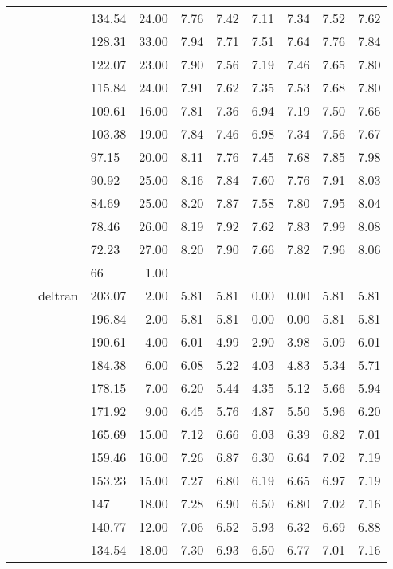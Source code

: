 \begin{longtable}{llllrrrrrrr}
   &  &  & 134.54 & 24.00 & 7.76 & 7.42 & 7.11 & 7.34 & 7.52 & 7.62 \\ 
   &  &  & 128.31 & 33.00 & 7.94 & 7.71 & 7.51 & 7.64 & 7.76 & 7.84 \\ 
   &  &  & 122.07 & 23.00 & 7.90 & 7.56 & 7.19 & 7.46 & 7.65 & 7.80 \\ 
   &  &  & 115.84 & 24.00 & 7.91 & 7.62 & 7.35 & 7.53 & 7.68 & 7.80 \\ 
   &  &  & 109.61 & 16.00 & 7.81 & 7.36 & 6.94 & 7.19 & 7.50 & 7.66 \\ 
   &  &  & 103.38 & 19.00 & 7.84 & 7.46 & 6.98 & 7.34 & 7.56 & 7.67 \\ 
   &  &  & 97.15 & 20.00 & 8.11 & 7.76 & 7.45 & 7.68 & 7.85 & 7.98 \\ 
   &  &  & 90.92 & 25.00 & 8.16 & 7.84 & 7.60 & 7.76 & 7.91 & 8.03 \\ 
   &  &  & 84.69 & 25.00 & 8.20 & 7.87 & 7.58 & 7.80 & 7.95 & 8.04 \\ 
   &  &  & 78.46 & 26.00 & 8.19 & 7.92 & 7.62 & 7.83 & 7.99 & 8.08 \\ 
   &  &  & 72.23 & 27.00 & 8.20 & 7.90 & 7.66 & 7.82 & 7.96 & 8.06 \\ 
   &  &  & 66 & 1.00 &  &  &  &  &  &  \\ 
   &  & deltran & 203.07 & 2.00 & 5.81 & 5.81 & 0.00 & 0.00 & 5.81 & 5.81 \\ 
   &  &  & 196.84 & 2.00 & 5.81 & 5.81 & 0.00 & 0.00 & 5.81 & 5.81 \\ 
   &  &  & 190.61 & 4.00 & 6.01 & 4.99 & 2.90 & 3.98 & 5.09 & 6.01 \\ 
   &  &  & 184.38 & 6.00 & 6.08 & 5.22 & 4.03 & 4.83 & 5.34 & 5.71 \\ 
   &  &  & 178.15 & 7.00 & 6.20 & 5.44 & 4.35 & 5.12 & 5.66 & 5.94 \\ 
   &  &  & 171.92 & 9.00 & 6.45 & 5.76 & 4.87 & 5.50 & 5.96 & 6.20 \\ 
   &  &  & 165.69 & 15.00 & 7.12 & 6.66 & 6.03 & 6.39 & 6.82 & 7.01 \\ 
   &  &  & 159.46 & 16.00 & 7.26 & 6.87 & 6.30 & 6.64 & 7.02 & 7.19 \\ 
   &  &  & 153.23 & 15.00 & 7.27 & 6.80 & 6.19 & 6.65 & 6.97 & 7.19 \\ 
   &  &  & 147 & 18.00 & 7.28 & 6.90 & 6.50 & 6.80 & 7.02 & 7.16 \\ 
   &  &  & 140.77 & 12.00 & 7.06 & 6.52 & 5.93 & 6.32 & 6.69 & 6.88 \\ 
   &  &  & 134.54 & 18.00 & 7.30 & 6.93 & 6.50 & 6.77 & 7.01 & 7.16 \\ 

\end{longtable}
